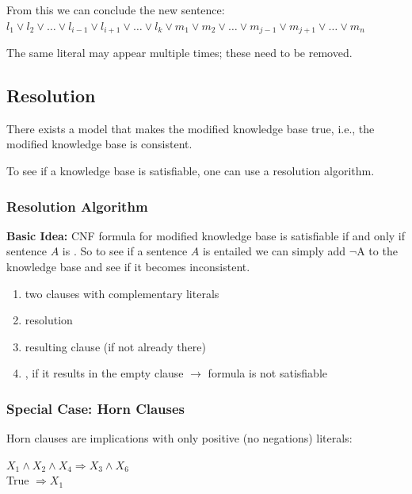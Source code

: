 \documentclass[
../../EiKI_Summary.tex,
]
{subfiles}
\begin{document}
From this we can conclude the new sentence: $l_1 \lor l_2 \lor \dots \lor l_{i-1} \lor l_{i+1} \lor \dots \lor l_k \lor m_1 \lor m_2 \lor \dots \lor m_{j-1} \lor m_{j+1} \lor \dots \lor m_n$ 

The same literal may appear multiple times; these need to be removed.

\subsection{Resolution}
\begin{defbox}
    [Satisfiable]
    There exists a model that makes the modified knowledge base true, i.e., the modified knowledge base is consistent.
\end{defbox}

To see if a knowledge base is satisfiable, one can use a resolution algorithm.

\subsubsection{Resolution Algorithm}
\textbf{Basic Idea:}
CNF formula for modified knowledge base is satisfiable if and only if sentence $A$ is .
So to see if a sentence $A$ is entailed we can simply add $\neg$A to the knowledge base and see if it becomes inconsistent.

\begin{enumerate}
    \item {} two clauses with complementary literals
    \item {} resolution
    \item {} resulting clause (if not already there)
    \item {}, if it results in the empty clause $\rightarrow$ formula is not satisfiable 
\end{enumerate}

\subsubsection*{Special Case: Horn Clauses}
\begin{defbox}
    Horn clauses are implications with only positive (no negations) literals:

    \begin{center}
        $X_1 \land X_2 \land X_4 \Rightarrow X_3 \land X_6$\\
        True $\Rightarrow X_1$
    \end{center}
\end{defbox}
\end{document}
